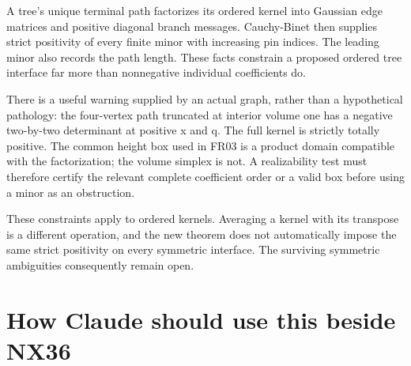 \documentclass[
  11pt,
  a4paper,
]{report}
\begin{document}
A tree's unique terminal path factorizes its ordered kernel into
Gaussian edge matrices and positive diagonal branch messages.
Cauchy-Binet then supplies strict positivity of every finite minor with
increasing pin indices. The leading minor also records the path length.
These facts constrain a proposed ordered tree interface far more than
nonnegative individual coefficients do.

There is a useful warning supplied by an actual graph, rather than a
hypothetical pathology: the four-vertex path truncated at interior
volume one has a negative two-by-two determinant at positive x and q.
The full kernel is strictly totally positive. The common height box used
in FR03 is a product domain compatible with the factorization; the
volume simplex is not. A realizability test must therefore certify the
relevant complete coefficient order or a valid box before using a minor
as an obstruction.

These constraints apply to ordered kernels. Averaging a kernel with its
transpose is a different operation, and the new theorem does not
automatically impose the same strict positivity on every symmetric
interface. The surviving symmetric ambiguities consequently remain open.

\hypertarget{how-claude-should-use-this-beside-nx36}{%
\section{How Claude should use this beside
NX36}\label{how-claude-should-use-this-beside-nx36}}
\end{document}
